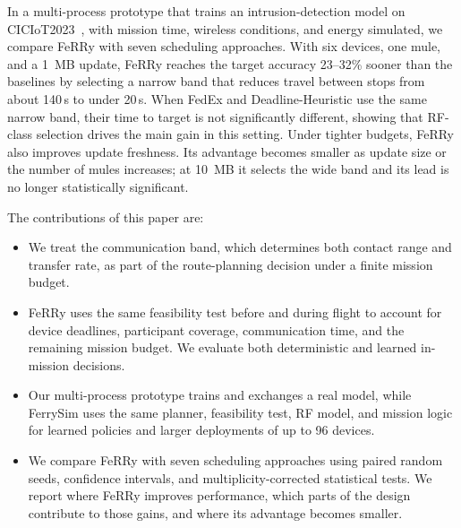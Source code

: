 \documentclass[conference]{IEEEtran}
\newcommand{\sysname}{FeRRy}
\begin{document}
In a multi-process prototype that trains an intrusion-detection model on
CICIoT2023~\cite{CiCIoT2023}, with mission time, wireless conditions, and
energy simulated, we compare \sysname{} with seven scheduling approaches.
With six devices, one mule, and a 1~MB update, \sysname{} reaches the target
accuracy 23--32\% sooner than the baselines by selecting a narrow band that
reduces travel between stops from about 140\,s to under 20\,s. When FedEx and
Deadline-Heuristic use the same narrow band, their time to target is not
significantly different, showing that RF-class selection drives the main gain
in this setting. Under tighter budgets, \sysname{} also improves update
freshness. Its advantage becomes smaller as update size or the number of mules
increases; at 10~MB it selects the wide band and its lead is no longer
statistically significant.

The contributions of this paper are:

\begin{itemize}

\item 

We treat the communication band, which determines both contact range and
transfer rate, as part of the route-planning decision under a finite mission
budget.

\item 

\sysname{} uses the same feasibility test before and during flight to account
for device deadlines, participant coverage, communication time, and the
remaining mission budget. We evaluate both deterministic and learned in-mission
decisions.

\item

Our multi-process prototype trains and exchanges a real model, while FerrySim
uses the same planner, feasibility test, RF model, and mission logic for learned
policies and larger deployments of up to 96 devices.

\item

We compare \sysname{} with seven scheduling approaches using paired random
seeds, confidence intervals, and multiplicity-corrected statistical tests. We
report where \sysname{} improves performance, which parts of the design
contribute to those gains, and where its advantage becomes smaller.


\end{itemize}
\end{document}
